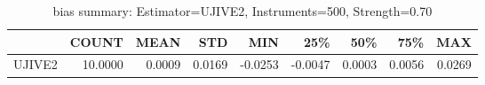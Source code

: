 \begin{table}[ht]
\centering
\caption{bias summary: Estimator=UJIVE2, Instruments=500, Strength=0.70}
\begin{tabular}{lrrrrrrrr}
\toprule
 & COUNT & MEAN & STD & MIN & 25\% & 50\% & 75\% & MAX \\
\midrule
UJIVE2 & 10.0000 & 0.0009 & 0.0169 & -0.0253 & -0.0047 & 0.0003 & 0.0056 & 0.0269 \\
\bottomrule
\end{tabular}
\end{table}
